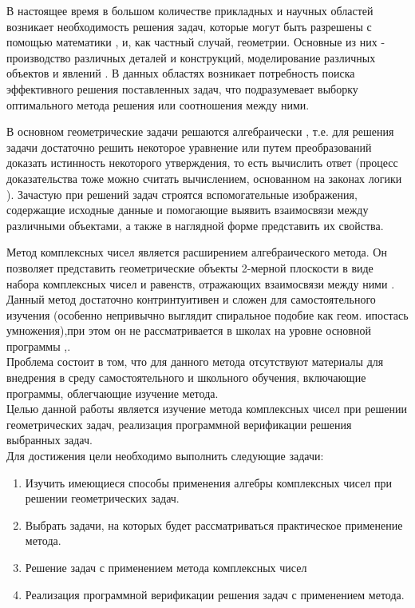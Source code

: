 

\lstset{language=[11]C++}


\thispagestyle{empty}
\clearpage

\tableofcontents

В настоящее время в большом количестве прикладных и научных областей возникает необходимость решения задач, которые могут быть разрешены с помощью математики \cite{book:sloyer}, и, как частный случай, геометрии. Основные из них - производство различных деталей и конструкций, моделирование
различных объектов и явлений \cite[с. 15]{book:kosnevsky}. В данных областях возникает потребность поиска эффективного решения
поставленных задач, что подразумевает выборку оптимального метода решения или соотношения между ними.

В основном геометрические задачи решаются алгебраически \cite{geom:methods}, т.е. для решения задачи достаточно решить некоторое уравнение или путем преобразований доказать истинность некоторого утверждения, то есть вычислить ответ (процесс доказательства тоже можно считать вычислением, основанном на законах логики \cite[с. 8]{book:takeuti}).
Зачастую при решений задач строятся вспомогательные изображения, содержащие исходные данные и помогающие выявить взаимосвязи между различными объектами, а также в наглядной форме представить их свойства.

Метод комплексных чисел является расширением алгебраического метода.
Он позволяет представить геометрические объекты 2-мерной плоскости в виде набора комплексных
чисел и равенств, отражающих взаимосвязи между ними \cite[с. 3]{book:arnold_complex}.\\
Данный метод достаточно контринтуитивен и сложен для самостоятельного изучения (особенно
непривычно выглядит спиральное подобие как геом. ипостась умножения),при этом он не рассматривается
в школах на уровне основной программы \cite{edu:problem},\cite[стр.6]{book:ponarin}.\\
Проблема состоит в том, что для данного метода отсутствуют материалы для внедрения в среду
самостоятельного и школьного обучения, включающие программы, облегчающие изучение метода.\\
Целью данной работы является изучение метода комплексных чисел при решении геометрических задач,
реализация программной верификации решения выбранных задач.\\
Для достижения цели необходимо выполнить следующие задачи:
\begin{enumerate}
   \item Изучить имеющиеся способы применения алгебры комплексных чисел при решении геометрических
         задач.
   \item Выбрать задачи, на которых будет рассматриваться практическое применение метода.
   \item Решение задач с применением метода комплексных чисел
   \item Реализация программной верификации решения задач с применением метода.
\end{enumerate}

